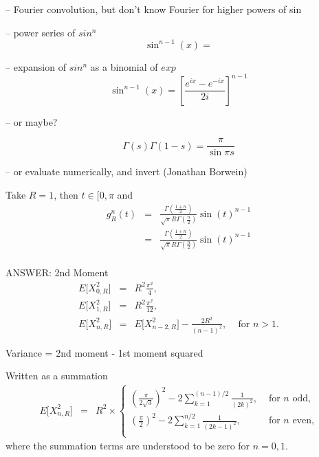 -- Fourier convolution, but don't know Fourier for higher powers of sin

-- power series of $sin^n$
\begin{equation}
  \label{eq:sin^n_taylor}
  \sin^{n-1}(x) = 
\end{equation}

-- expansion of $sin^n$ as a binomial of $exp$
\begin{equation}
  \label{eq:sin^n_taylor}
  \sin^{n-1}(x) = \left[ \frac{e^{i x} - e^{-i x} }{2 i} \right]^{n-1}
\end{equation}

-- or maybe?

\[ \Gamma(s) \Gamma(1-s) = \frac{\pi}{\sin \pi s} \]


-- or evaluate numerically, and invert (Jonathan Borwein)


Take $R=1$, then $t \in [0, \pi$ and 
\begin{eqnarray}
g_{R}^{n}(t) & = &   \frac{\Gamma\left(\frac{1+n}{2}\right) }
                         {\sqrt{\pi } R\Gamma\left(\frac{n}{2}\right)}  
                      \sin(t)^{n-1} \nonumber \\
   & = &   \frac{\Gamma\left(\frac{1+n}{2}\right) }
                {\sqrt{\pi } R\Gamma\left(\frac{n}{2}\right)}  
                      \sin(t)^{n-1} \nonumber \\
\end{eqnarray}






ANSWER: 2nd Moment
\begin{eqnarray}
  \label{eq:mean_nsphere_geo}
  E\big[ X_{0,R}^2 \big] & = & R^2 \frac{\pi^2}{4}, \\ 
  E\big[ X_{1,R}^2 \big] & = & R^2 \frac{\pi^2}{12}, \\ 
  E\big[ X_{n,R}^2 \big] & = & E\big[ X_{n-2,R}^2 \big] 
                                   - \frac{2 R^2}{(n-1)^2}, \;\;\;
                                   \mbox{ for } n > 1.
\end{eqnarray}

Variance = 2nd moment - 1st moment squared


Written as a summation
\begin{eqnarray}
  \label{eq:mean_nsphere_geo}
  E\big[ X_{n,R}^2 \big] & = & R^2 \times \left\{ \begin{array}{ll}
      \displaystyle
         \left( \frac{\pi}{2 \sqrt{3}} \right)^2
        - 2 \sum_{k=1}^{(n-1)/2} \frac{1}{(2k)^2}, & 
          \mbox{ for $n$ odd,} \\ 
      \displaystyle
         \left( \frac{\pi}{2} \right)^2 
        - 2 \sum_{k=1}^{n/2} \frac{1}{(2k-1)^2}, &
          \mbox{ for $n$ even,} \\ 
    \end{array} \right.
\end{eqnarray}
where the summation terms are understood to be zero for $n=0, 1$.

